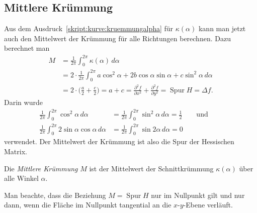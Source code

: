 \subsection{Mittlere Krümmung%
\label{skript:kurve:mittlerekruemmung}}
Aus dem Ausdruck~\eqref{skript:kurve:kruemmungalpha}
für $\kappa(\alpha)$ kann man jetzt auch den Mittelwert
der Krümmung für alle Richtungen berechnen.
Dazu berechnet man
\begin{align*}
M
&=
\frac{1}{2\pi}\int_0^{2\pi} \kappa(\alpha)\,d\alpha
\\
&=
2\cdot
\frac{1}{2\pi}\int_0^{2\pi}
a\cos^2\alpha + 2b\cos\alpha\sin\alpha + c\sin^2 \alpha
\,d\alpha
\\
&=
2\cdot\biggl( \frac{a}2 + \frac{c}2\biggr)
=
a+c
=
\frac{\partial^2 f}{\partial x^2}
+
\frac{\partial^2 f}{\partial y^2}
=
\operatorname{Spur}H
=
\Delta f.
\end{align*}
Darin wurde
\begin{align*}
\frac1{2\pi}\int_0^{2\pi}\cos^2\alpha\,d\alpha
&=
\frac1{2\pi}\int_0^{2\pi}\sin^2\alpha\,d\alpha
=
\frac12
\qquad\text{und}\qquad
\\
\frac{1}{2\pi}\int_0^{2\pi}2\sin\alpha\cos\alpha\,d\alpha
&=
\frac{1}{2\pi}\int_0^{2\pi}\sin2\alpha\,d\alpha
=
0
\end{align*}
verwendet.
Der Mittelwert der Krümmung ist also die Spur der Hessischen Matrix.

\begin{definition}
\label{skript:definition:mittlerekruemmung}
Die {\em Mittlere Krümmung} $M$ ist der Mittelwert der Schnittkrümmung
$\kappa(\alpha)$ über alle Winkel $\alpha$.
\end{definition}

Man beachte, dass die Beziehung $M=\operatorname{Spur}H$ nur 
im Nullpunkt gilt und nur dann, wenn die Fläche im Nullpunkt tangential
an die $x$-$y$-Ebene verläuft.




